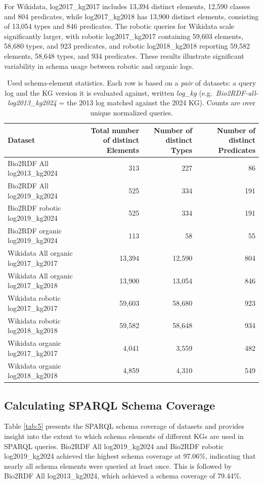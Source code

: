 \documentclass[sw]{iosart2x}
\begin{document}
For Wikidata, log2017\_kg2017 includes 13,394 distinct elements, 12,590 classes and 804 predicates, while log2017\_kg2018 has 13,900 distinct elements, consisting of 13,054 types and 846 predicates. The robotic queries for Wikidata scale significantly larger, with robotic log2017\_kg2017 containing 59,603 elements, 58,680 types, and 923 predicates, and robotic log2018\_kg2018 reporting 59,582 elements, 58,648 types, and 934 predicates. These results illustrate significant variability in schema usage between robotic and organic logs.
\begin{table}[ht]
\centering
\caption{Used schema-element statistics. Each row is based on a \emph{pair} of datasets: a query log and the KG version it is evaluated against, written \emph{log}\_\emph{kg} (e.g.\ \emph{Bio2RDF-all-log2013\_kg2024} = the 2013 log matched against the 2024 KG). Counts are over unique normalized queries.}
\label{tab:4}
\begin{tabular}{l|r|r|r}
\hline
Dataset & Total number of distinct Elements & Number of distinct Types & Number of distinct Predicates \\
\hline
Bio2RDF All log2013\_kg2024 & 313 & 227 & 86 \\
Bio2RDF All log2019\_kg2024 & 525 & 334 & 191 \\
Bio2RDF robotic log2019\_kg2024 &  525 & 334 & 191 \\
Bio2RDF organic log2019\_kg2024 &  113 & 58 & 55 \\
Wikidata All organic log2017\_kg2017 & 13,394 & 12,590 & 804 \\
Wikidata All organic log2017\_kg2018 & 13,900 & 13,054 & 846 \\
Wikidata robotic log2017\_kg2017 & 59,603 & 58,680 & 923 \\
Wikidata robotic log2018\_kg2018 & 59,582 & 58,648 & 934 \\
Wikidata organic log2017\_kg2017 & 4,041 & 3,559 & 482 \\
Wikidata organic log2018\_kg2018 & 4,859 & 4,310 & 549 \\
\hline
\end{tabular}
\end{table}

\subsection{Calculating SPARQL Schema Coverage}
Table \ref{tab:5} presents the SPARQL schema coverage of datasets and provides insight into the extent to which schema elements of different KGs are used in SPARQL queries. Bio2RDF All log2019\_kg2024 and Bio2RDF robotic log2019\_kg2024 achieved the highest schema coverage at 97.06\%, indicating that nearly all schema elements were queried at least once. This is followed by Bio2RDF All log2013\_kg2024, which achieved a schema coverage of 79.44\%.  
\end{document}
